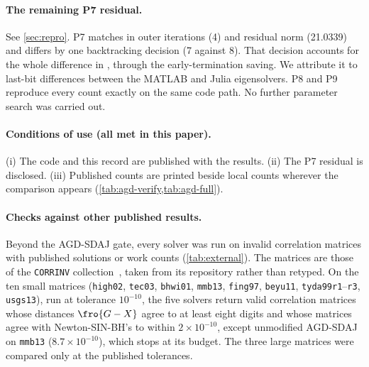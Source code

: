 \paragraph{The remaining P7 residual.}
See \cref{sec:repro}. P7 matches in outer iterations (4) and residual norm
(21.0339) and differs by one backtracking decision (7 against 8). That decision
accounts for the whole difference in \EVDs, through the early-termination
saving. We attribute it to last-bit differences between the MATLAB and Julia
eigensolvers. P8 and P9 reproduce every count exactly on the same code path.
No further parameter search was carried out.

\paragraph{Conditions of use (all met in this paper).}
(i) The code and this record are published with the results. (ii) The P7
residual is disclosed. (iii) Published counts are printed beside local counts
wherever the comparison appears (\cref{tab:agd-verify,tab:agd-full}).

\paragraph{Checks against other published results.}
Beyond the AGD-SDAJ gate, every solver was run on invalid correlation matrices
with published solutions or work counts
(\cref{tab:external}). The matrices are those of the \texttt{CORRINV}
collection~\cite{higham2022anymatrix}, taken from its repository rather than
retyped. On the ten small matrices (\texttt{high02}, \texttt{tec03},
\texttt{bhwi01}, \texttt{mmb13}, \texttt{fing97}, \texttt{beyu11},
\texttt{tyda99r1}--\texttt{r3}, \texttt{usgs13}), run at tolerance $10^{-10}$,
the five solvers return valid correlation matrices whose distances
$\fro{G-X}$ agree to at least eight digits and whose matrices agree with
Newton-SIN-BH's to within $2\times10^{-10}$, except unmodified AGD-SDAJ on
\texttt{mmb13} ($8.7\times10^{-10}$), which stops at its budget. The three
large matrices were compared only at the published tolerances.


